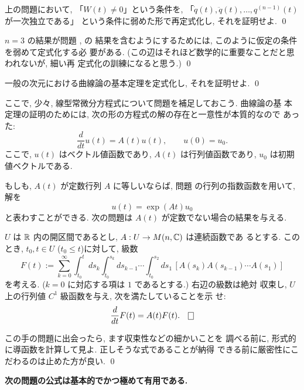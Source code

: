 \documentclass[12pt,twoside]{jarticle}
\begin{document}
\begin{question}
  上の問題において, 「$W(t) \ne 0$」という条件を, %
  「$\dot{q}(t), \ddot{q}(t), \dots, q^{(n-1)}(t)$ が一次独立である」
  という条件に弱めた形で再定式化し, それを証明せよ. \qed
\end{question}

\begin{rem}
$n=3$ の結果が問題 ,  の
結果を含むようにするためには, このように仮定の条件を弱めて定式化する必
要がある. (この辺はそれほど数学的に重要なことだと思われないが, 細い再
定式化の訓練になると思う.)
\qed
\end{rem}

\begin{question}
  一般の次元における曲線論の基本定理を定式化し, それを証明せよ. \qed
\end{question}

ここで, 少々, 線型常微分方程式について問題を補足しておこう. 曲線論の基
本定理の証明のためには, 次の形の方程式の解の存在と一意性が本質的なので
あった:
\[
  \frac{d}{dt} u(t) = A(t) u(t),
  \qquad
  u(0) = u_0.
\]%
ここで, $u(t)$ はベクトル値函数であり, $A(t)$ は行列値函数であり, 
$u_0$ は初期値ベクトルである.

もしも, $A(t)$ が定数行列 $A$ に等しいならば, 問題 
 の行列の指数函数を用いて, 解を
\[
  u(t) = \exp(At) u_0
\]
と表わすことができる. 次の問題は $A(t)$ が定数でない場合の結果を与える.

\begin{question}\label{q:DS1}
  $U$ は ${\mathbb R}$ 内の開区間であるとし, $A: U \to M(n,{\mathbb C})$ は連続函数であ
  るとする. このとき, $t_0, t \in U$ ($t_0 \le t$)に対して, 級数
  \[
    F(t)
    :=
    \sum_{k=0}^\infty
    \int_{t_0}^t ds_k \int_{t_0}^{s_k} ds_{k-1} \cdots \int_{t_0}^{s_2} ds_1\,
    [ A(s_k)A(s_{k-1})\cdots A(s_1) ]
  \] %
  を考える. ($k=0$ に対応する項は $1$ であるとする.) 右辺の級数は絶対
  収束し, $U$ 上の行列値 $C^1$ 級函数を与え, 次を満たしていることを示
  せ:
  \[
    \frac{d}{dt} F(t) = A(t) F(t).
  \qed
  \]
\end{question}

\begin{rem}
この手の問題に出会ったら, ます収束性などの細かいことを
調べる前に, 形式的に導函数を計算して見よ. 正しそうな式であることが納得
できる前に厳密性にこだわるのは止めた方が良い. 
\qed 
\end{rem}

{\bf 次の問題の公式は基本的でかつ極めて有用である.}
\end{document}
